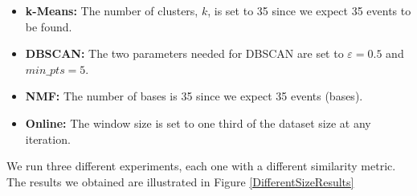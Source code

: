 \begin{itemize}
  \item \textbf{k-Means:} The number of clusters, $k$, is set to 35 since we expect 35 events to be found. 
  \item \textbf{DBSCAN:} The two parameters needed for DBSCAN are set to $ε=0.5$ and $min\_pts=5$. 
  \item \textbf{NMF:} The number of bases is 35 since we expect 35 events (bases).
  \item \textbf{Online:} The window size is set to one third of the dataset size at any iteration. 
\end{itemize}\vspace{15pt}
We run three different experiments, each one with a different similarity metric. The results we obtained are illustrated in Figure \ref{DifferentSizeResults}

